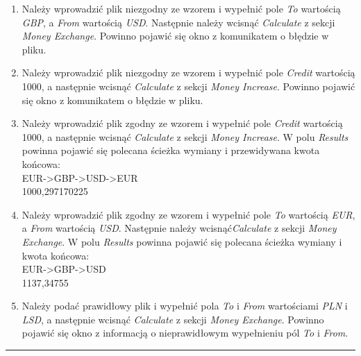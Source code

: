 \documentclass[a4paper,11pt]{article}
\newcommand{\linia}{\rule{\linewidth}{0.4mm}}
\begin{document}
\begin{enumerate}
\item Należy wprowadzić plik niezgodny ze wzorem i wypełnić pole \textit{To} wartością \textit{GBP}, a \textit{From} wartością \textit{USD}. Następnie należy wcisnąć \textit{Calculate} z sekcji \textit{Money Exchange}. Powinno pojawić się okno z komunikatem o błędzie w pliku.
\item Należy wprowadzić plik niezgodny ze wzorem i wypełnić pole \textit{Credit} wartością 1000, a następnie wcisnąć \textit{Calculate} z sekcji \textit{Money Increase}. Powinno pojawić się okno z komunikatem o błędzie w pliku.
\item Należy wprowadzić plik zgodny ze wzorem i wypełnić pole \textit{Credit} wartością 1000, a następnie wcisnąć \textit{Calculate} z sekcji \textit{Money Increase}. W polu \textit{Results} powinna pojawić się polecana ścieżka wymiany i przewidywana kwota końcowa:
\\EUR->GBP->USD->EUR
\\1000,297170225
\item Należy wprowadzić plik zgodny ze wzorem i wypełnić pole \textit{To} wartością \textit{EUR}, a \textit{From} wartością \textit{USD}. Następnie należy wcisnąć\textit{Calculate} z sekcji \textit{Money Exchange}. W polu \textit{Results} powinna pojawić się polecana ścieżka wymiany i kwota końcowa:
\\EUR->GBP->USD
\\1137,34755
\item Należy podać prawidłowy plik i wypełnić pola \textit{To} i \textit{From} wartościami \textit{PLN} i \textit{LSD}, a następnie wcisnąć \textit{Calculate} z sekcji \textit{Money Exchange}. Powinno pojawić się okno z informacją o nieprawidłowym wypełnieniu pól \textit{To} i \textit{From}.
\end{enumerate}
\noindent\linia
\end{document}
